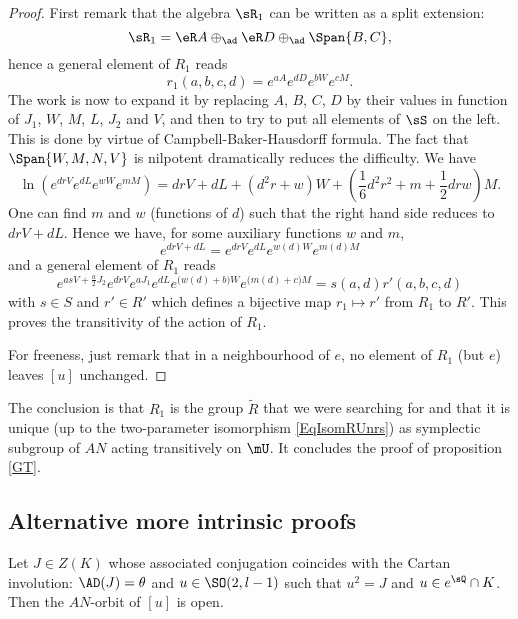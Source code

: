 \begin{proof}

First remark that the algebra $\sR_1$ can be written as a split extension:
\[ 
  \sR_1=\eR A\oplus_{\ad} \eR D\oplus_{\ad}\Span\{ B,C \},
\]
hence a general element of $R_1$ reads
 \begin{equation}
r_1(a,b,c,d)= e^{aA} e^{dD} e^{bW} e^{cM}.
\end{equation}
The work is now to expand it by replacing $A$, $B$, $C$, $D$ by their values in function of $J_1$, $W$, $M$, $L$, $J_2$ and $V$, and then to try to put all elements of $\sS$ on the left. This is done by virtue of Campbell-Baker-Hausdorff formula. The fact that $\Span\{ W,M,N,V \}$ is nilpotent dramatically reduces the difficulty. We have
\[ 
  \ln( e^{drV} e^{dL} e^{wW} e^{mM})= drV+dL+(d^{2}r+w)W+(\frac{1}{ 6 }d^{2}r^{2}+m+\frac{ 1 }{2}drw)M.
\]
One can find $m$ and $w$ (functions of $d$) such that the right hand side reduces to $drV+dL$. Hence we have, for some auxiliary functions $w$ and $m$,
\[ 
   e^{drV+dL}= e^{drV} e^{dL} e^{w(d)W} e^{m(d)M}
\]
and a general element of $R_1$ reads
\begin{equation}
 e^{asV+\frac{ a }{2}J_2} e^{drV} e^{aJ_1} e^{dL} e^{\big( w(d)+b \big)W} e^{\big( m(d)+c \big)M}=s(a,d)r'(a,b,c,d)
\end{equation}
with $s\in S$ and $r'\in R'$ which defines a bijective map $r_1\mapsto r'$ from $R_1$ to $R'$. This proves the transitivity of the action of $R_1$.

 For freeness, just remark that in a neighbourhood of $e$, no element of $R_1$ (but $e$) leaves $[u]$ unchanged.
\end{proof}

The conclusion is that $R_1$ is the group $\tilde{R}$ that we were searching for and that it is unique (up to the two-parameter isomorphism \eqref{EqIsomRUnrs}) as symplectic subgroup of $AN$ acting transitively on $\mU$. It concludes the proof of proposition \ref{GT}.

\subsection{Alternative more intrinsic proofs}		\label{subSecAltreintr}

\begin{proposition}
Let $J\in Z(K)$ whose associated conjugation coincides with the Cartan involution: $\AD(J)=\theta$ and $u\in\SO(2,l-1)$ such that $u^2=J$ and $u\in e^{\sQ}\cap K$. Then the $AN$-orbit of $[u]$ is open.
\end{proposition}

